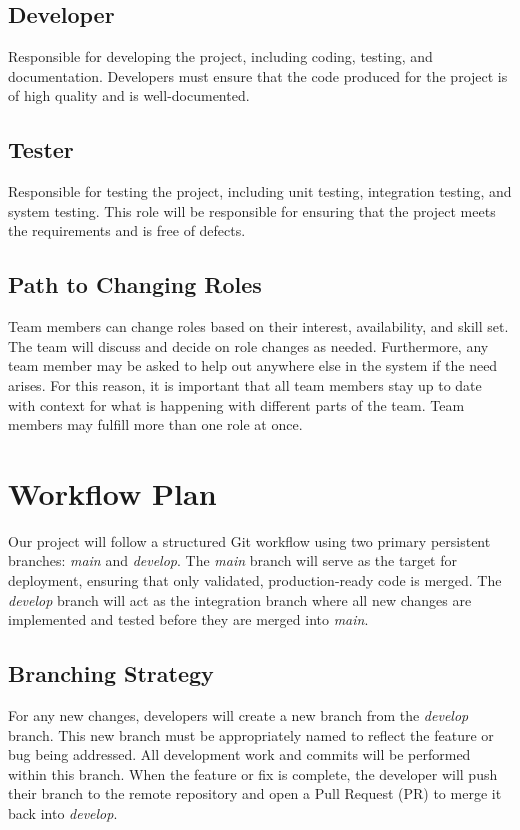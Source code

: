 \documentclass{article}
\begin{document}
\subsection*{Developer} Responsible for developing the project, including coding, testing, and documentation. Developers must ensure that the code produced for the project is of high quality and is well-documented.
\subsection*{Tester} Responsible for testing the project, including unit testing, integration testing, and system testing. This role will be responsible for ensuring that the project meets the requirements and is free of defects.
\subsection*{Path to Changing Roles} Team members can change roles based on their interest, availability, and skill set. The team will discuss and decide on role changes as needed. Furthermore, any team member may be asked to help out anywhere else in the system if the need arises. For this reason, it is important that all team members stay up to date with context for what is happening with different parts of the team. Team members may fulfill more than one role at once.

\section{Workflow Plan}
Our project will follow a structured Git workflow using two primary persistent branches: \textit{main} and \textit{develop}. The \textit{main} branch will serve as the target for deployment, ensuring that only validated, production-ready code is merged. The \textit{develop} branch will act as the integration branch where all new changes are implemented and tested before they are merged into \textit{main}.

\subsection*{Branching Strategy}
For any new changes, developers will create a new branch from the \textit{develop} branch. This new branch must be appropriately named to reflect the feature or bug being addressed. All development work and commits will be performed within this branch. When the feature or fix is complete, the developer will push their branch to the remote repository and open a Pull Request (PR) to merge it back into \textit{develop}.
\end{document}
